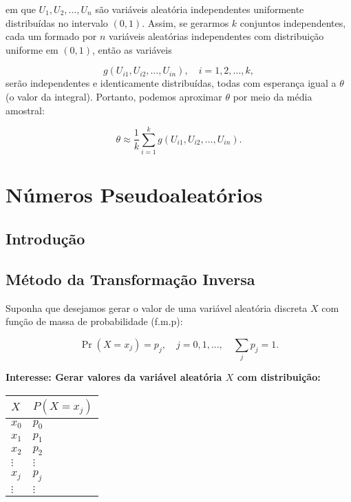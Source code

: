 \documentclass[
  letterpaper,
  DIV=11,
  numbers=noendperiod]{scrreprt}
\begin{document}
em que \(U_1, U_2, \dots, U_n\) são variáveis aleatória independentes
uniformente distribuídas no intervalo \((0, 1)\). Assim, se gerarmos
\(k\) conjuntos independentes, cada um formado por \(n\) variáveis
aleatórias independentes com distribuição uniforme em \((0, 1)\), então
as variáveis

\[g(U_{i1}, U_{i2}, \dots, U_{in}), \quad i = 1, 2, \dots, k,\] serão
independentes e identicamente distribuídas, todas com esperança igual a
\(\theta\) (o valor da integral). Portanto, podemos aproximar \(\theta\)
por meio da média amostral:

\[\theta \approx \frac{1}{k}\sum\limits_{i=1}^{k}g(U_{i1}, U_{i2}, \dots, U_{in}).\]


\chapter{Números Pseudoaleatórios}\label{nuxfameros-pseudoaleatuxf3rios}

\section{Introdução}\label{introduuxe7uxe3o-1}

\section{Método da Transformação
Inversa}\label{muxe9todo-da-transformauxe7uxe3o-inversa}

Suponha que desejamos gerar o valor de uma variável aleatória discreta
\(X\) com função de massa de probabilidade (f.m.p):

\[\Pr(X = x_j) = p_j, \quad j = 0, 1, \dots, \quad \sum\limits_j p_j = 1.\]

\begin{tcolorbox}[enhanced jigsaw, toprule=.15mm, arc=.35mm, colframe=quarto-callout-important-color-frame, breakable, opacityback=0, rightrule=.15mm, bottomrule=.15mm, left=2mm, leftrule=.75mm, colback=white]

\vspace{-3mm}\textbf{\textbf{Interesse:} Gerar valores da variável aleatória \(X\) com
distribuição:}\vspace{3mm}

\begin{longtable}[]{@{}ll@{}}
\toprule\noalign{}
\(X\) & \(P(X=x_j)\) \\
\midrule\noalign{}
\endhead
\bottomrule\noalign{}
\endlastfoot
\(x_0\) & \(p_0\) \\
\(x_1\) & \(p_1\) \\
\(x_2\) & \(p_2\) \\
\(\vdots\) & \(\vdots\) \\
\(x_j\) & \(p_j\) \\
\(\vdots\) & \(\vdots\) \\
\end{longtable}

\end{tcolorbox}
\end{document}
